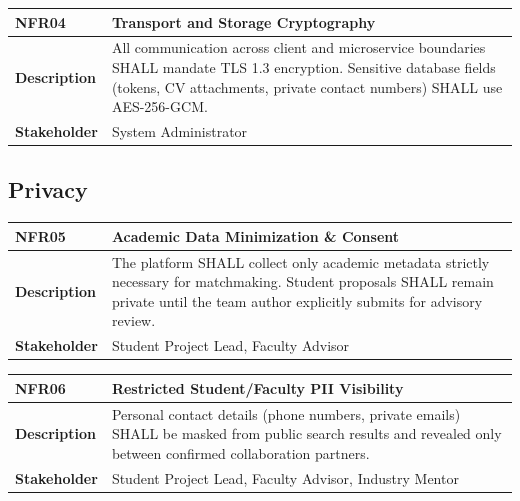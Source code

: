 \begin{table}[H]
\centering
\small
\begin{tabularx}{\textwidth}{|l|X|}
\hline
\rowcolor{lightgray!40} \textbf{NFR04} & \textbf{Transport and Storage Cryptography} \\ \hline
\textbf{Description} & All communication across client and microservice boundaries SHALL mandate TLS 1.3 encryption. Sensitive database fields (tokens, CV attachments, private contact numbers) SHALL use AES-256-GCM. \\ \hline
\textbf{Stakeholder} & System Administrator \\ \hline
\end{tabularx}
\end{table}

\subsection{Privacy}
\label{subsec:nfr_privacy}

\begin{table}[H]
\centering
\small
\begin{tabularx}{\textwidth}{|l|X|}
\hline
\rowcolor{lightgray!40} \textbf{NFR05} & \textbf{Academic Data Minimization \& Consent} \\ \hline
\textbf{Description} & The platform SHALL collect only academic metadata strictly necessary for matchmaking. Student proposals SHALL remain private until the team author explicitly submits for advisory review. \\ \hline
\textbf{Stakeholder} & Student Project Lead, Faculty Advisor \\ \hline
\end{tabularx}
\end{table}

\begin{table}[H]
\centering
\small
\begin{tabularx}{\textwidth}{|l|X|}
\hline
\rowcolor{lightgray!40} \textbf{NFR06} & \textbf{Restricted Student/Faculty PII Visibility} \\ \hline
\textbf{Description} & Personal contact details (phone numbers, private emails) SHALL be masked from public search results and revealed only between confirmed collaboration partners. \\ \hline
\textbf{Stakeholder} & Student Project Lead, Faculty Advisor, Industry Mentor \\ \hline
\end{tabularx}
\end{table}

